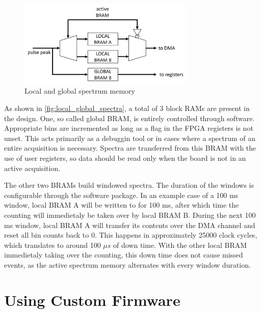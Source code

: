 \documentclass[a4paper,12pt,table]{article}
\begin{document}
\newpage
		\begin{figure}[!ht]
			\centering
			\includegraphics[width=0.75\textwidth]{img/local_global_spectra.png}
			\caption{Local and global spectrum memory}\label{fig:local_global_spectra}
		\end{figure}
		As shown in \autoref{fig:local_global_spectra}, a total of 3 block RAMs are present in the design. 
		One, so called global BRAM, is entirely controlled through software.
		Appropriate bins are incremented as long as a flag in the FPGA registers is not unset.
		This acts primarily as a debuggin tool or in cases where a spectrum of an entire acquisition is necessary.
		Spectra are transferred from this BRAM with the use of user registers,
		so data should be read only when the board is not in an active acquisition.
		\par
		The other two BRAMs build windowed spectra. 
		The duration of the windows is configurable through the software package.
		In an example case of a 100 ms window, local BRAM A will be written to for 100 ms, 
		after which time the counting will immedietaly be taken over by local BRAM B. 
		During the next 100 ms window, local BRAM A will transfer its contents over the DMA channel 
		and reset all bin counts back to 0. This happens in approximately 25000 clock cycles,
		which translates to around 100 $\mu s$ of down time. 
		With the other local BRAM immedietaly taking over the counting, 
		this down time does not cause missed events, 
		as the active spectrum memory alternates with every window duration.
\newpage
\section{Using Custom Firmware}
\end{document}
